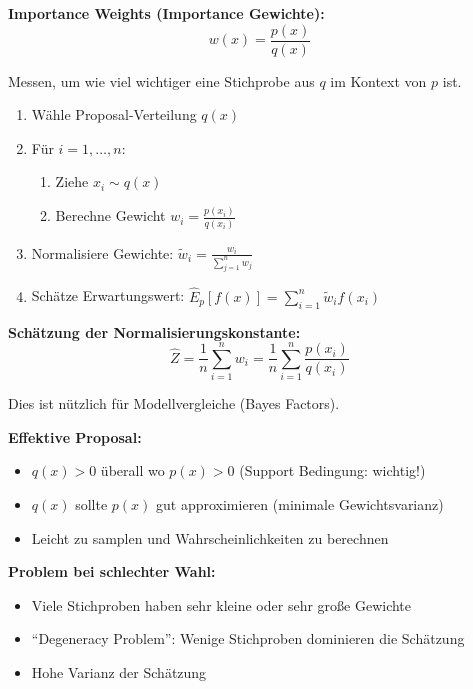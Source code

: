 \textbf{Importance Weights (Importance Gewichte):}
$$w(x) = \frac{p(x)}{q(x)}$$

Messen, um wie viel wichtiger eine Stichprobe aus $q$ im Kontext von $p$ ist.


\begin{enumerate}[leftmargin=1.5em]
    \item Wähle Proposal-Verteilung $q(x)$
    \item Für $i = 1, \ldots, n$:
    \begin{enumerate}[leftmargin=1.5em]
        \item Ziehe $x_i \sim q(x)$
        \item Berechne Gewicht $w_i = \frac{p(x_i)}{q(x_i)}$
    \end{enumerate}
    \item Normalisiere Gewichte: $\tilde{w}_i = \frac{w_i}{\sum_{j=1}^{n} w_j}$
    \item Schätze Erwartungswert: $\hat{E}_p[f(x)] = \sum_{i=1}^{n} \tilde{w}_i f(x_i)$
\end{enumerate}

\textbf{Schätzung der Normalisierungskonstante:}
$$\hat{Z} = \frac{1}{n} \sum_{i=1}^{n} w_i = \frac{1}{n} \sum_{i=1}^{n} \frac{p(x_i)}{q(x_i)}$$

Dies ist nützlich für Modellvergleiche (Bayes Factors).


\textbf{Effektive Proposal:}
\begin{itemize}[leftmargin=1.5em]
    \item $q(x) > 0$ überall wo $p(x) > 0$ (Support Bedingung: wichtig!)
    \item $q(x)$ sollte $p(x)$ gut approximieren (minimale Gewichtsvarianz)
    \item Leicht zu samplen und Wahrscheinlichkeiten zu berechnen
\end{itemize}

\textbf{Problem bei schlechter Wahl:}
\begin{itemize}[leftmargin=1.5em]
    \item Viele Stichproben haben sehr kleine oder sehr große Gewichte
    \item ``Degeneracy Problem'': Wenige Stichproben dominieren die Schätzung
    \item Hohe Varianz der Schätzung
\end{itemize}

